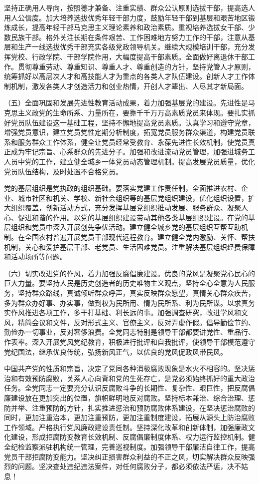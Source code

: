 坚持正确用人导向，按照德才兼备、注重实绩、群众公认原则选拔干部，提高选人用人公信度。加大培养选拔优秀年轻干部力度，鼓励年轻干部到基层和艰苦地区锻炼成长，提高年轻干部马克思主义理论素养和政治素质。重视培养选拔女干部、少数民族干部。格外关注长期在条件艰苦、工作困难地方努力工作的干部，注意从基层和生产一线选拔优秀干部充实各级党政领导机关。继续大规模培训干部，充分发挥党校、行政学院、干部学院作用，大幅度提高干部素质。全面做好离退休干部工作。贯彻尊重劳动、尊重知识、尊重人才、尊重创造的方针，坚持党管人才原则，统筹抓好以高层次人才和高技能人才为重点的各类人才队伍建设。创新人才工作体制机制，激发各类人才创造活力和创业热情，开创人才辈出、人尽其才新局面。

（五）全面巩固和发展先进性教育活动成果，着力加强基层党的建设。先进性是马克思主义政党的生命所系、力量所在，要靠千千万万高素质党员来体现。要扎实抓好党员队伍建设这一基础工程，坚持不懈地提高党员素质。认真学习和遵守党章，增强党员意识，建立党员党性定期分析制度，拓宽党员服务群众渠道，构建党员联系和服务群众工作体系，健全让党员经常受教育、永葆先进性长效机制，使党员真正成为牢记宗旨、心系群众的先进分子。加强和改进流动党员管理，加强进城务工人员中党的工作，建立健全城乡一体党员动态管理机制。提高发展党员质量，优化党员队伍结构，及时处置不合格党员。

党的基层组织是党执政的组织基础。要落实党建工作责任制，全面推进农村、企业、城市社区和机关、学校、新社会组织等的基层党组织建设，优化组织设置，扩大组织覆盖，创新活动方式，充分发挥基层党组织推动发展、服务群众、凝聚人心、促进和谐的作用。以党的基层组织建设带动其他各类基层组织建设。在党的基层组织和党员中深入开展创先争优活动。建立健全城乡党的基层组织互帮互助机制。在全国农村普遍开展党员干部现代远程教育。建立健全党内激励、关怀、帮扶机制，关心和爱护基层干部、老党员、生活困难党员。注重解决基层组织经费保障和活动场所等问题。

（六）切实改进党的作风，着力加强反腐倡廉建设。优良的党风是凝聚党心民心的巨大力量。要坚持人民是历史创造者的历史唯物主义观点，坚持全心全意为人民服务，坚持群众路线，真诚倾听群众呼声，真实反映群众愿望，真情关心群众疾苦，多为群众办好事、办实事，做到权为民所用、情为民所系、利为民所谋。以求真务实作风推进各项工作，多干打基础、利长远的事。加强调查研究，改进学风和文风，精简会议和文件，反对形式主义、官僚主义，反对弄虚作假。倡导勤俭节约、勤俭办一切事业，反对奢侈浪费。全党同志特别是领导干部都要讲党性、重品行、作表率。深入开展党风党纪教育，积极进行批评和自我批评，使领导干部模范遵守党纪国法，继承优良传统，弘扬新风正气，以优良的党风促政风带民风。

中国共产党的性质和宗旨，决定了党同各种消极腐败现象是水火不相容的。坚决惩治和有效预防腐败，关系人心向背和党的生死存亡，是党必须始终抓好的重大政治任务。全党同志一定要充分认识反腐败斗争的长期性、复杂性、艰巨性，把反腐倡廉建设放在更加突出的位置，旗帜鲜明地反对腐败。坚持标本兼治、综合治理、惩防并举、注重预防的方针，扎实推进惩治和预防腐败体系建设，在坚决惩治腐败的同时，更加注重治本，更加注重预防，更加注重制度建设，拓展从源头上防治腐败工作领域。严格执行党风廉政建设责任制。坚持深化改革和创新体制，加强廉政文化建设，形成拒腐防变教育长效机制、反腐倡廉制度体系、权力运行监控机制。健全纪检监察派驻机构统一管理，完善巡视制度。加强领导干部廉洁自律工作，提高党员干部拒腐防变能力。坚决纠正损害群众利益的不正之风，切实解决群众反映强烈的问题。坚决查处违纪违法案件，对任何腐败分子，都必须依法严惩，决不姑息！

